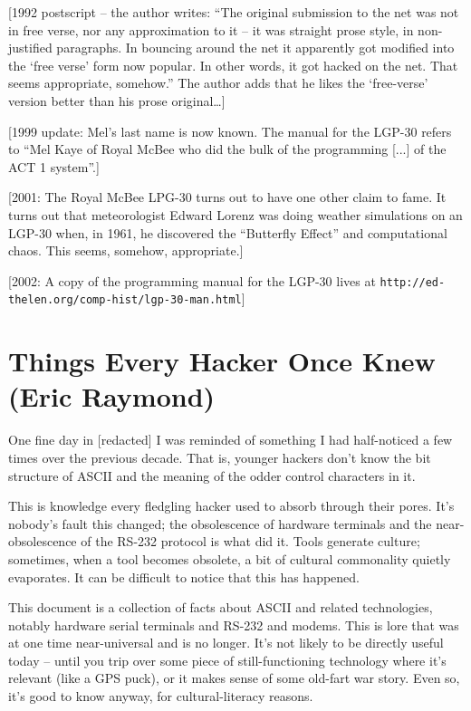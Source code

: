\documentclass[10pt,twoside,openany]{memoir}
\begin{document}
\vskip 0.4in

[1992 postscript -- the author writes: ``The original submission to the net was not in free verse, nor any approximation to it -- it was straight prose style, in non-justified paragraphs. In bouncing around the net it apparently got modified into the `free verse' form now popular. In other words, it got hacked on the net. That seems appropriate, somehow.'' The author adds that he likes the `free-verse' version better than his prose original\dots]

[1999 update: Mel's last name is now known. The manual for the LGP-30 refers to ``Mel Kaye of Royal McBee who did the bulk of the programming [...] of the ACT 1 system''.]

[2001: The Royal McBee LPG-30 turns out to have one other claim to fame. It turns out that meteorologist Edward Lorenz was doing weather simulations on an LGP-30 when, in 1961, he discovered the ``Butterfly Effect'' and computational chaos. This seems, somehow, appropriate.]

[2002: A copy of the programming manual for the LGP-30 lives at {\footnotesize \texttt{http://ed-thelen.org/comp-hist/lgp-30-man.html}}]


\chapter{Things Every Hacker Once Knew (Eric Raymond)}

One fine day in [redacted] I was reminded of something I had half-noticed a few times over the previous decade. That is, younger hackers don't know the bit structure of ASCII and the meaning of the odder control characters in it.

This is knowledge every fledgling hacker used to absorb through their pores. It's nobody's fault this changed; the obsolescence of hardware terminals and the near-obsolescence of the RS-232 protocol is what did it. Tools generate culture; sometimes, when a tool becomes obsolete, a bit of cultural commonality quietly evaporates. It can be difficult to notice that this has happened.

This document is a collection of facts about ASCII and related technologies, notably hardware serial terminals and RS-232 and modems. This is lore that was at one time near-universal and is no longer. It's not likely to be directly useful today -- until you trip over some piece of still-functioning technology where it's relevant (like a GPS puck), or it makes sense of some old-fart war story. Even so, it's good to know anyway, for cultural-literacy reasons.
\end{document}
